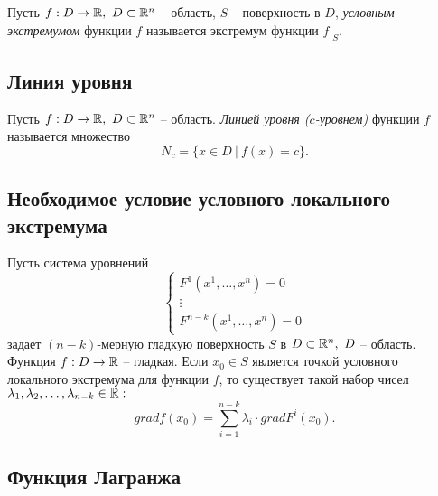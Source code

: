 \begin{definition}
    Пусть $f:D\rightarrow\mathbb{R}, \ D \subset \mathbb{R}^n$ -- область, $S$ -- поверхность в $D$, \emph{условным экстремумом} функции $f$ называется экстремум функции $f\big|_S$.
\end{definition}

\subsection{Линия уровня}

\begin{definition}
    Пусть $f:D\rightarrow\mathbb{R}, \ D \subset \mathbb{R}^n$ -- область. \emph{Линией уровня ($c$-уровнем)} функции $f$ называется множество
    \[
        N_c = \big\{x\in D \ \big| \ f(x) = c\big\}.
    \]
\end{definition}

\subsection{Необходимое условие условного локального экстремума}

\begin{theorem}
    Пусть система уровнений
    \begin{equation}\label{eq:20}
        \left\{\begin{array}{l}
            F^1(x^1,\ldots,x^n) = 0 \\
            \vdots                  \\
            F^{n-k}(x^1,\ldots,x^n) = 0
        \end{array}\right.
    \end{equation}
    задает $(n-k)$-мерную гладкую поверхность $S$ в $D \subset \mathbb{R}^n, \ D$ -- область. Функция $f:D\rightarrow\mathbb{R}$ -- гладкая. Если $x_0 \in S$ является точкой условного локального экстремума для функции $f$, то существует такой набор чисел $\lambda_1,\lambda_2,\ldots,\lambda_{n-k} \in \mathbb{R}:$
    \[
        grad f(x_0) = \sum_{i = 1}^{n-k}\lambda_i \cdot grad F^i(x_0).
    \]
\end{theorem}

\subsection{Функция Лагранжа}

